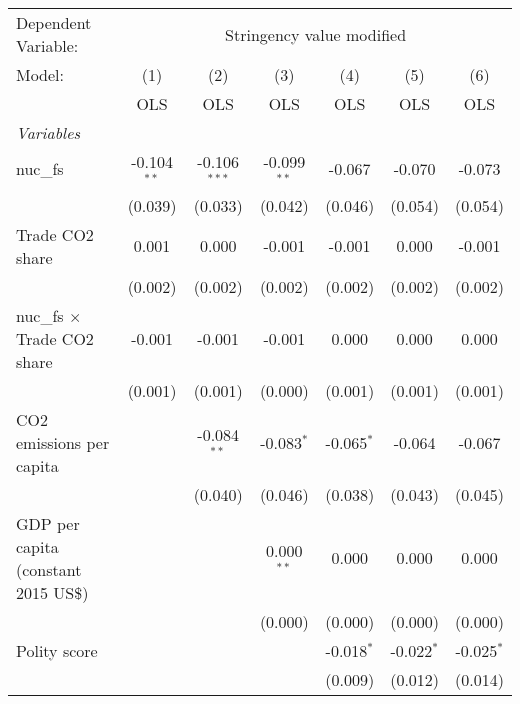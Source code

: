 
\begingroup
\centering
\begin{tabular}{lcccccc}
   \toprule
   Dependent Variable: & \multicolumn{6}{c}{Stringency value modified}\\
   Model:                               & (1)           & (2)            & (3)           & (4)          & (5)          & (6)\\  
                                        &  OLS          & OLS            & OLS           & OLS          & OLS          & OLS\\  
   \midrule
   \emph{Variables}\\
   nuc\_fs                              & -0.104$^{**}$ & -0.106$^{***}$ & -0.099$^{**}$ & -0.067       & -0.070       & -0.073\\   
                                        & (0.039)       & (0.033)        & (0.042)       & (0.046)      & (0.054)      & (0.054)\\   
   Trade CO2 share                      & 0.001         & 0.000          & -0.001        & -0.001       & 0.000        & -0.001\\   
                                        & (0.002)       & (0.002)        & (0.002)       & (0.002)      & (0.002)      & (0.002)\\   
   nuc\_fs $\times$ Trade CO2 share     & -0.001        & -0.001         & -0.001        & 0.000        & 0.000        & 0.000\\   
                                        & (0.001)       & (0.001)        & (0.000)       & (0.001)      & (0.001)      & (0.001)\\   
   CO2 emissions per capita             &               & -0.084$^{**}$  & -0.083$^{*}$  & -0.065$^{*}$ & -0.064       & -0.067\\   
                                        &               & (0.040)        & (0.046)       & (0.038)      & (0.043)      & (0.045)\\   
   GDP per capita (constant 2015 US\$)  &               &                & 0.000$^{**}$  & 0.000        & 0.000        & 0.000\\   
                                        &               &                & (0.000)       & (0.000)      & (0.000)      & (0.000)\\   
   Polity score                         &               &                &               & -0.018$^{*}$ & -0.022$^{*}$ & -0.025$^{*}$\\   
                                        &               &                &               & (0.009)      & (0.012)      & (0.014)\\   

\end{tabular}
